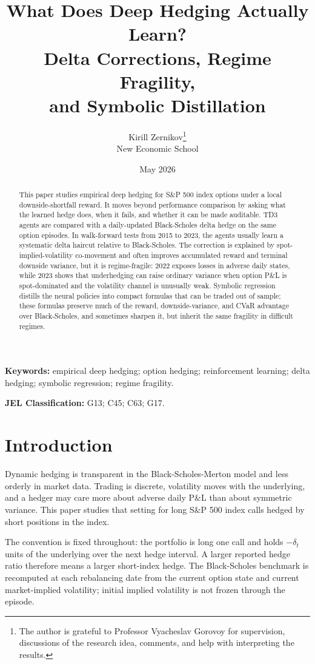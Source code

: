 \documentclass[a4paper,12pt]{article}
\title{What Does Deep Hedging Actually Learn?\\ Delta Corrections, Regime Fragility,\\ and Symbolic Distillation}
\author{Kirill Zernikov\thanks{The author is grateful to Professor Vyacheslav Gorovoy for supervision, discussions of the research idea, comments, and help with interpreting the results.}\\
New Economic School}
\date{May 2026}
\numberwithin{equation}{section}
\begin{document}
\maketitle

\begin{abstract}

This paper studies empirical deep hedging for S\&P 500 index options under a local downside-shortfall reward. It moves beyond performance comparison by asking what the learned hedge does, when it fails, and whether it can be made auditable. TD3 agents are compared with a daily-updated Black-Scholes delta hedge on the same option episodes. In walk-forward tests from 2015 to 2023, the agents usually learn a systematic delta haircut relative to Black-Scholes. The correction is explained by spot-implied-volatility co-movement and often improves accumulated reward and terminal downside variance, but it is regime-fragile: 2022 exposes losses in adverse daily states, while 2023 shows that underhedging can raise ordinary variance when option P\&L is spot-dominated and the volatility channel is unusually weak. Symbolic regression distills the neural policies into compact formulas that can be traded out of sample; these formulas preserve much of the reward, downside-variance, and CVaR advantage over Black-Scholes, and sometimes sharpen it, but inherit the same fragility in difficult regimes.
\end{abstract}

\noindent\textbf{Keywords:} empirical deep hedging; option hedging; reinforcement learning; delta hedging; symbolic regression; regime fragility.

\medskip
\noindent\textbf{JEL Classification:} G13; C45; C63; G17.

\bigskip

\section{Introduction}

Dynamic hedging is transparent in the Black-Scholes-Merton model and less orderly in market data. Trading is discrete, volatility moves with the underlying, and a hedger may care more about adverse daily P\&L than about symmetric variance. This paper studies that setting for long S\&P 500 index calls hedged by short positions in the index.

The convention is fixed throughout: the portfolio is long one call and holds $-\delta_t$ units of the underlying over the next hedge interval. A larger reported hedge ratio therefore means a larger short-index hedge. The Black-Scholes benchmark is recomputed at each rebalancing date from the current option state and current market-implied volatility; initial implied volatility is not frozen through the episode.
\end{document}
